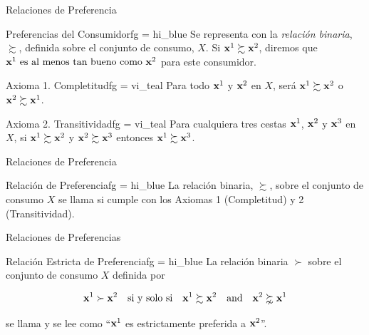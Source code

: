 \documentclass[10pt,aspectratio=169]{beamer}  %
\begin{document}
\begin{frame}{Relaciones de Preferencia}
	\begin{varblock}{Preferencias del Consumidor}{fg = hi_blue}
	  \vsf
    Se representa con la \textit{relación binaria}, $\succsim$, definida sobre el conjunto 
    de consumo, $X$. Si $\mathbf{x}^1 \succsim \mathbf{x}^2$, diremos que $\mathbf{x}^1 \text{ es al menos tan bueno como } \mathbf{x}^2$
    para este consumidor.
    \vsf
  \end{varblock}
  \vspace{10pt}\pause
  \begin{varblock}{Axioma 1. Completitud}{fg = vi_teal}
    \vsf
	    Para todo $\mathbf{x}^1$ y $\mathbf{x}^2$ en $X$, será $\mathbf{x}^1 \succsim \mathbf{x}^2$ o $\mathbf{x}^2 \succsim \mathbf{x}^1$. 
    \vsf
  \end{varblock}
  \vspace{10pt} \pause
  \begin{varblock}{Axioma 2. Transitividad}{fg = vi_teal}
    \vsf
	    Para cualquiera tres cestas $\mathbf{x}^1$, $\mathbf{x}^2$ y $\mathbf{x}^3$ en $X$, 
      si  $\mathbf{x}^1 \succsim \mathbf{x}^2$ y $\mathbf{x}^2 \succsim \mathbf{x}^3$ entonces $\mathbf{x}^1 \succsim \mathbf{x}^3$. 
    \vsf
  \end{varblock}

\end{frame}

\begin{frame}{Relaciones de Preferencia}
	\begin{varblock}{Relación de Preferencia}{fg = hi_blue}
	  \vsf
    La relación binaria, $\succsim$, sobre el conjunto de consumo $X$ se llama 
    si cumple con los Axiomas 1 (Completitud) y 2 (Transitividad).
    \vsf
  \end{varblock}

\end{frame}


\begin{frame}{Relaciones de Preferencias}
  \begin{varblock}{Relación Estricta de Preferencia}{fg = hi_blue}
    \vsf
    La relación binaria $\succ$ sobre el conjunto de consumo $X$ definida por
    
    \[ \mathbf{x}^1 \succ \mathbf{x}^2 \quad \text{si y solo si} \quad \mathbf{x}^1 \succsim \mathbf{x}^2 \quad \text{and} \quad \mathbf{x}^2 \succnsim  \mathbf{x}^1\]

    se llama  y se lee como ``$\mathbf{x}^1$ es estrictamente preferida a $\mathbf{x}^2$''.
    \vsf
  \end{varblock}

\end{frame}
\end{document}
